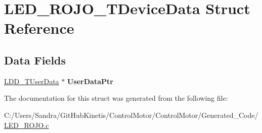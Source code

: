 \hypertarget{struct_l_e_d___r_o_j_o___t_device_data}{}\section{L\+E\+D\+\_\+\+R\+O\+J\+O\+\_\+\+T\+Device\+Data Struct Reference}
\label{struct_l_e_d___r_o_j_o___t_device_data}
\subsection*{Data Fields}
\begin{DoxyCompactItemize}
\item 
\hyperlink{group___p_e___types__module_ga0b66a73f87238a782318aa0be7578e35}{L\+D\+D\+\_\+\+T\+User\+Data} $\ast$ {\bfseries User\+Data\+Ptr}\hypertarget{struct_l_e_d___r_o_j_o___t_device_data_a33bdd5c4ca461536f0ffbe9ec9ad5675}{}\label{struct_l_e_d___r_o_j_o___t_device_data_a33bdd5c4ca461536f0ffbe9ec9ad5675}

\end{DoxyCompactItemize}


The documentation for this struct was generated from the following file\+:\begin{DoxyCompactItemize}
\item 
C\+:/\+Users/\+Sandra/\+Git\+Hub\+Kinetis/\+Control\+Motor/\+Control\+Motor/\+Generated\+\_\+\+Code/\hyperlink{_l_e_d___r_o_j_o_8c}{L\+E\+D\+\_\+\+R\+O\+J\+O.\+c}\end{DoxyCompactItemize}
